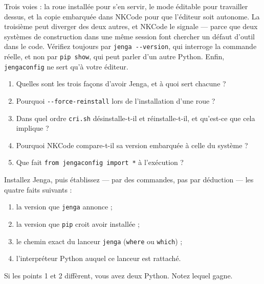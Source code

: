 \begin{nkbilan}
Trois voies : la roue installée pour s'en servir, le mode éditable pour
travailler dessus, et la copie embarquée dans NKCode pour que l'éditeur soit
autonome. La troisième peut diverger des deux autres, et NKCode le signale ---
parce que deux systèmes de construction dans une même session font chercher un
défaut d'outil dans le code. Vérifiez toujours par \texttt{jenga -{}-version}, qui
interroge la commande réelle, et non par \texttt{pip show}, qui peut parler d'un
autre Python. Enfin, \texttt{jengaconfig} ne sert qu'à votre éditeur.
\end{nkbilan}

\begin{nkquestions}
\begin{enumerate}
\item Quelles sont les trois façons d'avoir Jenga, et à quoi sert chacune ?
\item Pourquoi \texttt{-{}-force-reinstall} lors de l'installation d'une roue ?
\item Dans quel ordre \texttt{cri.sh} désinstalle-t-il et réinstalle-t-il, et
      qu'est-ce que cela implique ?
\item Pourquoi NKCode compare-t-il sa version embarquée à celle du système ?
\item Que fait \texttt{from jengaconfig import *} à l'exécution ?
\end{enumerate}
\end{nkquestions}

\begin{nkpratique}
Installez Jenga, puis établissez --- par des commandes, pas par déduction --- les
quatre faits suivants :

\begin{enumerate}
\item la version que \texttt{jenga} annonce ;
\item la version que \texttt{pip} croit avoir installée ;
\item le chemin exact du lanceur \texttt{jenga} (\texttt{where} ou
      \texttt{which}) ;
\item l'interpréteur Python auquel ce lanceur est rattaché.
\end{enumerate}

Si les points 1 et 2 diffèrent, vous avez deux Python. Notez lequel gagne.
\end{nkpratique}

